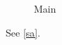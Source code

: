 \documentclass{article}
\begin{document}
\begin{figure}
\caption{Main}
\end{figure}
See \ref{sa}.
\end{document}
